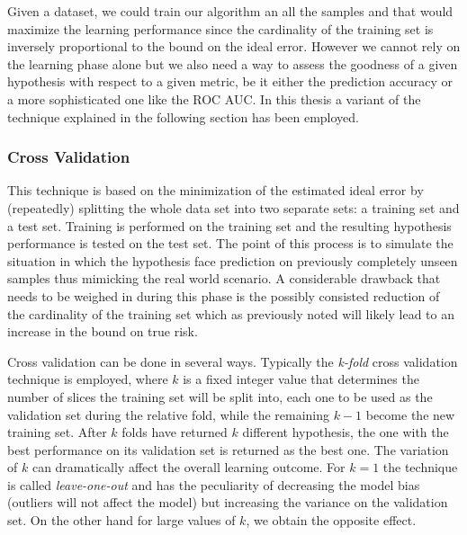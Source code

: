 Given a dataset, we could train our algorithm an all the samples and that would
maximize the learning performance since the cardinality of the training set is
inversely proportional to the bound on the ideal error.
However we cannot rely on the learning phase alone but we also need a way to
assess the goodness of a given hypothesis with respect to a given metric, be it 
either the prediction accuracy or a more sophisticated one like the ROC AUC.
In this thesis a variant of the technique explained in the following section
has been employed.


\subsubsection{Cross Validation}
This technique is based on the minimization of the estimated ideal error by
(repeatedly) splitting the whole data set into two separate sets: a training set
and a test set.
Training is performed on the training set and the resulting hypothesis performance
is tested on the test set.
The point of this process is to simulate the situation in which the hypothesis
face prediction on previously completely unseen samples thus mimicking the real
world scenario.
A considerable drawback that needs to be weighed in during this phase is the 
possibly consisted reduction of the cardinality of the training set which as 
previously noted will likely lead to an increase in the bound on true risk.

Cross validation can be done in several ways. Typically the \emph{k-fold} cross
validation technique is employed, where $k$ is a fixed integer value that
determines the number of slices the training set will be split into, each one to
be used as the validation set during the relative fold, while the remaining $k-1$
become the new training set.
After $k$ folds have returned $k$ different hypothesis, the one with the best
performance on its validation set is returned as the best one.
The variation of $k$ can dramatically affect the overall learning outcome.
For $k=1$ the technique is called \emph{leave-one-out} and has the peculiarity
of decreasing the model bias (outliers will not affect the model) but increasing
the variance on the validation set.
On the other hand for large values of $k$, we obtain the opposite effect.

